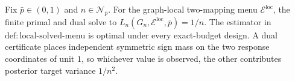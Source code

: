 Fix \(\bar p\in(0,1)\) and \(n\in\mathcal N_{\bar p}\). For the graph-local two-mapping menu \(\mathcal E^{\mathrm{loc}}\), the finite primal and dual solve to \(L_n(G_n,\mathcal E^{\mathrm{loc}},\bar p)=1/n\). The estimator in \(\mathrm{def{:}local\text{-}solved\text{-}menu}\) is optimal under every exact-budget design. A dual certificate places independent symmetric sign mass on the two response coordinates of unit \(1\), so whichever value is observed, the other contributes posterior target variance \(1/n^2\).